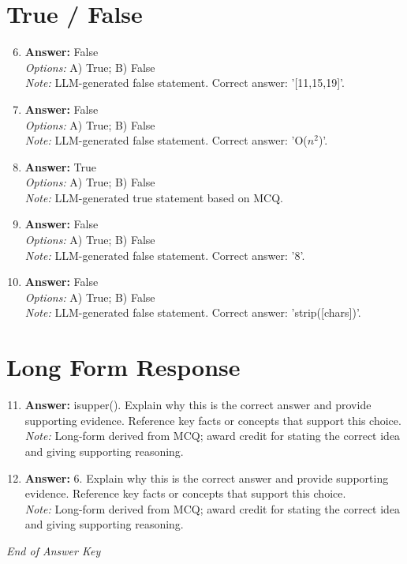 \documentclass[12pt]{article}
\begin{document}
\section*{True / False}
\begin{enumerate}[label=\arabic*.]
\setcounter{enumi}{5}
\item \textbf{Answer:} False
\\ \textit{Options:} A) True; B) False
\\ \textit{Note:} LLM-generated false statement. Correct answer: '[11,15,19]'.
\item \textbf{Answer:} False
\\ \textit{Options:} A) True; B) False
\\ \textit{Note:} LLM-generated false statement. Correct answer: 'O($n^2$)'.
\item \textbf{Answer:} True
\\ \textit{Options:} A) True; B) False
\\ \textit{Note:} LLM-generated true statement based on MCQ.
\item \textbf{Answer:} False
\\ \textit{Options:} A) True; B) False
\\ \textit{Note:} LLM-generated false statement. Correct answer: '8'.
\item \textbf{Answer:} False
\\ \textit{Options:} A) True; B) False
\\ \textit{Note:} LLM-generated false statement. Correct answer: 'strip([chars])'.
\end{enumerate}

\section*{Long Form Response}
\begin{enumerate}[label=\arabic*.]
\setcounter{enumi}{10}
\item \textbf{Answer:} isupper(). Explain why this is the correct answer and provide supporting evidence. Reference key facts or concepts that support this choice.
\\ \textit{Note:} Long-form derived from MCQ; award credit for stating the correct idea and giving supporting reasoning.
\item \textbf{Answer:} 6. Explain why this is the correct answer and provide supporting evidence. Reference key facts or concepts that support this choice.
\\ \textit{Note:} Long-form derived from MCQ; award credit for stating the correct idea and giving supporting reasoning.
\end{enumerate}

\vfill
\noindent\textit{End of Answer Key}
\end{document}
